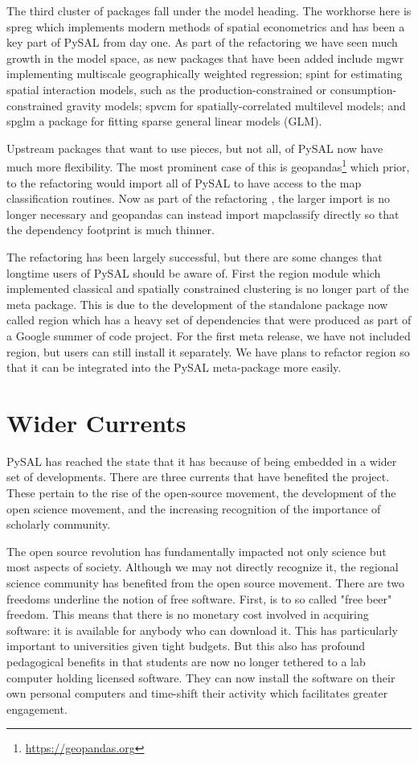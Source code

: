 \documentclass[11pt]{article}
\begin{document}
The third cluster of packages fall under the model heading. The workhorse here
is spreg which implements modern methods of spatial econometrics and has been a
key part of PySAL from day one. As part of the refactoring we have seen much
growth in the model space, as new packages that have been added include mgwr
implementing multiscale geographically weighted regression; spint for
estimating spatial interaction models, such as the production-constrained or
consumption-constrained gravity models;  spvcm for spatially-correlated
multilevel models; and spglm a package for fitting sparse general linear models
(GLM).


Upstream packages that want to use pieces, but not all, of PySAL now have much
more flexibility. The most prominent case of this is geopandas\footnote{\url{https://geopandas.org}}
which prior, to the refactoring would import all of PySAL to have access to
the map classification routines. Now as part of the refactoring , the larger
import is no longer necessary and geopandas can instead import mapclassify
directly so that the dependency footprint is much thinner.


The refactoring has been largely successful, but there are some changes that
longtime users of PySAL should be aware of. First the region module which
implemented classical and spatially constrained clustering is no longer part of
the meta package. This is due to the development of the standalone package now
called region which has a heavy set of dependencies that were produced as part
of a Google summer of code project. For the first meta release, we have not
included region, but users can still install it separately. We have plans to
refactor region so that it can be integrated into the PySAL meta-package more
easily.

\section*{Wider Currents}
\label{sec:org701c4d3}
PySAL has reached the state that it has because of being embedded in a wider set
of developments. There are three currents that have benefited the project. These
pertain to the rise of the open-source movement, the development of the open
science movement, and the increasing recognition of the importance of scholarly
community.

The open source revolution has fundamentally impacted not only science but most
aspects of society. Although we may not directly recognize it, the regional
science community has benefited from the open source movement. There are two
freedoms underline the notion of free software. First, is to so called "free
beer" freedom. This means that there is no monetary cost involved in acquiring
software: it is available for anybody who can download it. This has
particularly important to universities given tight budgets. But this also has
profound pedagogical benefits in that students are now no longer tethered to a
lab computer holding licensed software. They can now install the software on
their own personal computers and time-shift their activity which facilitates
greater engagement.
\end{document}
